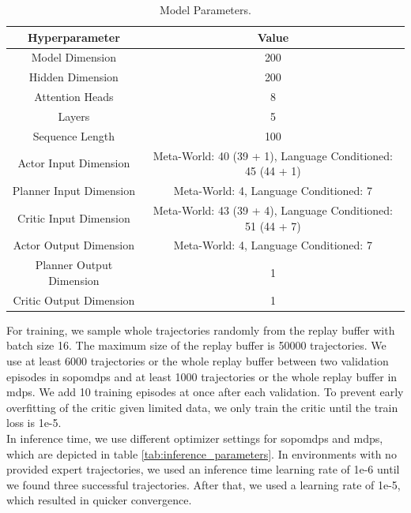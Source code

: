 \begin{table}[H]
    \centering
    \begin{tabular}{|c|c|}
    \hline
    Hyperparameter & Value \\
    \hline\hline
    Model Dimension & 200 \\
    \hline
    Hidden Dimension & 200 \\
    \hline
    Attention Heads & 8\\
    \hline
    Layers & 5 \\
    \hline
    Sequence Length & 100\\
    \hline
    Actor Input Dimension& Meta-World: 40 (39 + 1), Language Conditioned: 45 (44 + 1)\\
    \hline
    Planner Input Dimension&Meta-World: 4, Language Conditioned: 7\\
    \hline
    Critic Input Dimension& Meta-World: 43 (39 + 4), Language Conditioned: 51 (44 + 7)\\
    \hline
    Actor Output Dimension& Meta-World: 4, Language Conditioned: 7\\
    \hline
    Planner Output Dimension & 1\\
    \hline
    Critic Output Dimension& 1\\
    \hline
    \end{tabular}
    \caption{Model Parameters.}
    \label{tab:model_parameters}
\end{table}


For training, we sample whole trajectories randomly from the replay buffer with batch size 16. The maximum size of the replay buffer is 50000 trajectories. 
We use at least 6000 trajectories or the whole replay buffer between two validation episodes in \ac{sopomdp}s and at least 1000 trajectories or the whole 
replay buffer in \ac{mdp}s. We add 10 training episodes at once after each validation. To prevent early overfitting of the critic given limited data, 
we only train the critic until the train loss is 1e-5.
\\

In inference time, we use different optimizer settings for \ac{sopomdp}s and \ac{mdp}s, which are depicted in table \ref{tab:inference_parameters}. 
In environments with no provided expert trajectories, we used an inference time learning rate of 1e-6 until we found three successful trajectories. 
After that, we used a learning rate of 1e-5, which resulted in quicker convergence. 


